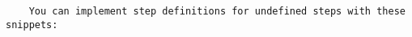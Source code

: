 \begin{verbatim}
    You can implement step definitions for undefined steps with these snippets:
\end{verbatim}
